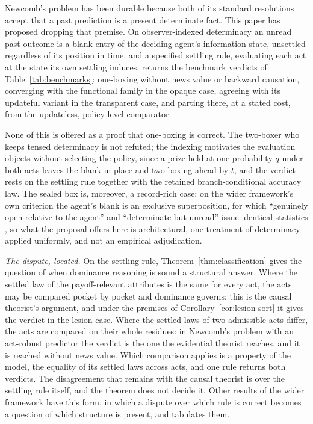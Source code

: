 \noindent Newcomb's problem has been durable because both of its standard resolutions accept that a past prediction is a present determinate fact. This paper has proposed dropping that premise. On observer-indexed determinacy an unread past outcome is a blank entry of the deciding agent's information state, unsettled regardless of its position in time, and a specified settling rule, evaluating each act at the state its own settling induces, returns the benchmark verdicts of Table~\ref{tab:benchmarks}: one-boxing without news value or backward causation, converging with the functional family in the opaque case, agreeing with its updateful variant in the transparent case, and parting there, at a stated cost, from the updateless, policy-level comparator.

None of this is offered as a proof that one-boxing is correct. The two-boxer who keeps tensed determinacy is not refuted; the indexing motivates the evaluation objects without selecting the policy, since a prize held at one probability $q$ under both acts leaves the blank in place and two-boxing ahead by $t$, and the verdict rests on the settling rule together with the retained branch-conditional accuracy law. The sealed box is, moreover, a record-rich case: on the wider framework's own criterion the agent's blank is an exclusive superposition, for which ``genuinely open relative to the agent'' and ``determinate but unread'' issue identical statistics \cite{AethusBrief}, so what the proposal offers here is architectural, one treatment of determinacy applied uniformly, and not an empirical adjudication.

\noindent\textit{The dispute, located.} On the settling rule, Theorem~\ref{thm:classification} gives the question of when dominance reasoning is sound a structural answer. Where the settled law of the payoff-relevant attributes is the same for every act, the acts may be compared pocket by pocket and dominance governs: this is the causal theorist's argument, and under the premises of Corollary~\ref{cor:lesion-sort} it gives the verdict in the lesion case. Where the settled laws of two admissible acts differ, the acts are compared on their whole residues: in Newcomb's problem with an act-robust predictor the verdict is the one the evidential theorist reaches, and it is reached without news value. Which comparison applies is a property of the model, the equality of its settled laws across acts, and one rule returns both verdicts. The disagreement that remains with the causal theorist is over the settling rule itself, and the theorem does not decide it. Other results of the wider framework have this form, in which a dispute over which rule is correct becomes a question of which structure is present, and \cite{AethusBrief} tabulates them.

